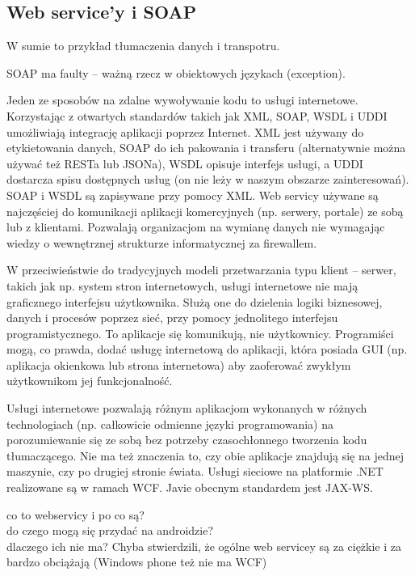 \subsection{Web service'y i SOAP}
W sumie to przykład tłumaczenia danych  i transpotru.

SOAP ma faulty -- ważną rzecz w obiektowych językach (exception).

Jeden ze sposobów na zdalne wywoływanie kodu to usługi internetowe. Korzystając z otwartych standardów takich jak XML, SOAP, WSDL i UDDI umożliwiają integrację aplikacji poprzez Internet. XML jest używany do etykietowania danych, SOAP do ich pakowania i transferu (alternatywnie można używać też RESTa lub JSONa), WSDL opisuje interfejs usługi, a UDDI dostarcza spisu dostępnych usług (on nie leży w naszym obszarze zainteresowań). SOAP i WSDL są zapisywane przy pomocy XML. Web servicy używane są najczęściej do komunikacji aplikacji komercyjnych (np. serwery, portale) ze sobą lub z klientami. Pozwalają organizacjom na wymianę danych nie wymagając wiedzy o wewnętrznej strukturze informatycznej za firewallem.

W przeciwieństwie do tradycyjnych modeli przetwarzania typu klient – serwer, takich jak np. system stron internetowych, usługi internetowe nie mają graficznego interfejsu użytkownika. Służą one do dzielenia logiki biznesowej, danych i procesów poprzez sieć, przy pomocy jednolitego interfejsu programistycznego. To aplikacje się komunikują, nie użytkownicy. Programiści mogą, co prawda, dodać usługę internetową do aplikacji, która posiada GUI (np. aplikacja okienkowa lub strona internetowa) aby zaoferować zwykłym użytkownikom jej funkcjonalność.

Usługi internetowe pozwalają różnym aplikacjom wykonanych w różnych technologiach (np. całkowicie odmienne języki programowania) na porozumiewanie się ze sobą bez potrzeby czasochłonnego tworzenia kodu tłumaczącego. Nie ma też znaczenia to, czy obie aplikacje znajdują się na jednej maszynie, czy po drugiej stronie świata.
Usługi sieciowe na platformie .NET realizowane są w ramach WCF. Javie obecnym standardem jest JAX-WS.

co to webservicy i po co są?\\
do czego mogą się przydać na androidzie?\\
dlaczego ich nie ma? Chyba stwierdzili, że ogólne web servicey są za ciężkie i za bardzo obciążają (Windows phone też nie ma WCF)\\

